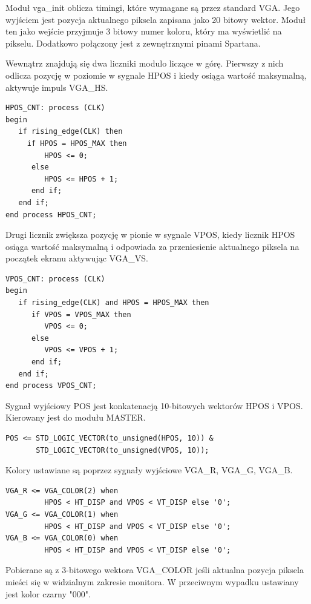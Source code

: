 \documentclass[11pt]{article}
\begin{document}
Moduł vga\_init oblicza timingi, które wymagane są przez standard VGA.
Jego wyjściem jest pozycja aktualnego piksela zapisana jako 20 bitowy wektor.
Moduł ten jako wejście przyjmuje 3 bitowy numer koloru, który ma wyświetlić na pikselu.
Dodatkowo połączony jest z zewnętrznymi pinami Spartana.

Wewnątrz znajdują się dwa liczniki modulo liczące w górę.
Pierwszy z nich odlicza pozycję w poziomie w sygnale HPOS i kiedy osiąga wartość maksymalną, aktywuje impuls VGA\_HS.

\begin{lstlisting}[caption=Sterowanie pozycją piksela w poziomie]
HPOS_CNT: process (CLK) 
begin
   if rising_edge(CLK) then
     if HPOS = HPOS_MAX then
         HPOS <= 0;
      else
         HPOS <= HPOS + 1;
      end if;
   end if;
end process HPOS_CNT;
\end{lstlisting}

Drugi licznik zwiększa pozycję w pionie w sygnale VPOS, kiedy licznik HPOS osiąga wartość maksymalną i odpowiada za przeniesienie aktualnego piksela na początek ekranu aktywując VGA\_VS.

\begin{lstlisting}[caption=Sterowanie pozycją piksela w pionie]
VPOS_CNT: process (CLK) 
begin
   if rising_edge(CLK) and HPOS = HPOS_MAX then
      if VPOS = VPOS_MAX then
         VPOS <= 0;
      else
         VPOS <= VPOS + 1;
      end if;
   end if;
end process VPOS_CNT;
\end{lstlisting}

Sygnał wyjściowy POS jest konkatenacją 10-bitowych wektorów HPOS i VPOS. 
Kierowany jest do modułu MASTER.

\begin{lstlisting}[caption=Przypisanie wektora z pozycją piksela]
POS <= STD_LOGIC_VECTOR(to_unsigned(HPOS, 10)) &
       STD_LOGIC_VECTOR(to_unsigned(VPOS, 10));
\end{lstlisting}

Kolory ustawiane są poprzez sygnały wyjściowe VGA\_R, VGA\_G, VGA\_B.

\begin{lstlisting}[caption=Ustawienie kolorów]
VGA_R <= VGA_COLOR(2) when
         HPOS < HT_DISP and VPOS < VT_DISP else '0';
VGA_G <= VGA_COLOR(1) when
         HPOS < HT_DISP and VPOS < VT_DISP else '0';
VGA_B <= VGA_COLOR(0) when
         HPOS < HT_DISP and VPOS < VT_DISP else '0';
\end{lstlisting}

Pobierane są z 3-bitowego wektora VGA\_COLOR jeśli aktualna pozycja piksela mieści się w widzialnym zakresie monitora.
W przeciwnym wypadku ustawiany jest kolor czarny "000".
\end{document}
